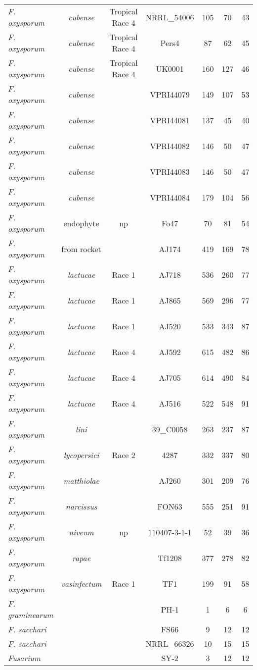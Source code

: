 \begin{longtable}{@{}lcccccc@{}}
\textit{F. oxysporum} & \textit{cubense} & Tropical Race 4 & NRRL\_54006 & 105 & 70 & 43 \\
\textit{F. oxysporum} & \textit{cubense} & Tropical Race 4 & Pers4 & 87 & 62 & 45 \\
\textit{F. oxysporum} & \textit{cubense} & Tropical Race 4 & UK0001 & 160 & 127 & 46 \\
\textit{F. oxysporum} & \textit{cubense} &  & VPRI44079 & 149 & 107 & 53 \\
\textit{F. oxysporum} & \textit{cubense} &  & VPRI44081 & 137 & 45 & 40 \\
\textit{F. oxysporum} & \textit{cubense} &  & VPRI44082 & 146 & 50 & 47 \\
\textit{F. oxysporum} & \textit{cubense} &  & VPRI44083 & 146 & 50 & 47 \\
\textit{F. oxysporum} & \textit{cubense} &  & VPRI44084 & 179 & 104 & 56 \\
\textit{F. oxysporum} & endophyte & np & Fo47 & 70 & 81 & 54 \\
\textit{F. oxysporum} & from rocket &  & AJ174 & 419 & 169 & 78 \\
\textit{F. oxysporum} & \textit{lactucae} & Race 1 & AJ718 & 536 & 260 & 77 \\
\textit{F. oxysporum} & \textit{lactucae} & Race 1 & AJ865 & 569 & 296 & 77 \\
\textit{F. oxysporum} & \textit{lactucae} & Race 1 & AJ520 & 533 & 343 & 87 \\
\textit{F. oxysporum} & \textit{lactucae} & Race 4 & AJ592 & 615 & 482 & 86 \\
\textit{F. oxysporum} & \textit{lactucae} & Race 4 & AJ705 & 614 & 490 & 84 \\
\textit{F. oxysporum} & \textit{lactucae} & Race 4 & AJ516 & 522 & 548 & 91 \\
\textit{F. oxysporum} & \textit{lini} &  & 39\_C0058 & 263 & 237 & 87 \\
\textit{F. oxysporum} & \textit{lycopersici} & Race 2 & 4287 & 332 & 337 & 80 \\
\textit{F. oxysporum} & \textit{matthiolae} &  & AJ260 & 301 & 209 & 76 \\
\textit{F. oxysporum} & \textit{narcissus} &  & FON63 & 555 & 251 & 91 \\
\textit{F. oxysporum} & \textit{niveum} & np & 110407-3-1-1 & 52 & 39 & 36 \\
\textit{F. oxysporum} & \textit{rapae} &  & Tf1208 & 377 & 278 & 82 \\
\textit{F. oxysporum} & \textit{vasinfectum} & Race 1 & TF1 & 199 & 91 & 58 \\
\textit{F. graminearum} &  &  & PH-1 & 1 & 6 & 6 \\
\textit{F. sacchari} &  &  & FS66 & 9 & 12 & 12 \\
\textit{F. sacchari} &  &  & NRRL\_66326 & 10 & 15 & 15 \\
\textit{Fusarium} &  &  & SY-2 & 3 & 12 & 12 \\* \bottomrule
\end{longtable}

\endgroup